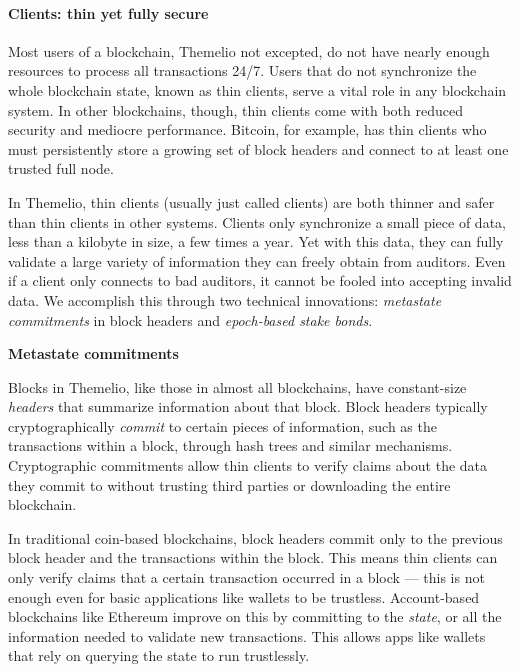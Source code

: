 \documentclass[]{article}
\let\oldparagraph\paragraph
\renewcommand{\paragraph}[1]{\oldparagraph{#1}\mbox{}}
\begin{document}
\hypertarget{clients-thin-yet-fully-secure}{%
\paragraph{Clients: thin yet fully
secure}\label{clients-thin-yet-fully-secure}}

Most users of a blockchain, Themelio not excepted, do not have nearly
enough resources to process all transactions 24/7. Users that do not
synchronize the whole blockchain state, known as thin clients, serve a
vital role in any blockchain system. In other blockchains, though, thin
clients come with both reduced security and mediocre performance.
Bitcoin, for example, has thin clients who must persistently store a
growing set of block headers and connect to at least one trusted full
node.

In Themelio, thin clients (usually just called clients) are both thinner
and safer than thin clients in other systems. Clients only synchronize a
small piece of data, less than a kilobyte in size, a few times a year.
Yet with this data, they can fully validate a large variety of
information they can freely obtain from auditors. Even if a client only
connects to bad auditors, it cannot be fooled into accepting invalid
data. We accomplish this through two technical innovations:
\emph{metastate commitments} in block headers and \emph{epoch-based
stake bonds}.

\textbf{Metastate commitments}

Blocks in Themelio, like those in almost all blockchains, have
constant-size \emph{headers} that summarize information about that
block. Block headers typically cryptographically \emph{commit} to
certain pieces of information, such as the transactions within a block,
through hash trees and similar mechanisms. Cryptographic commitments
allow thin clients to verify claims about the data they commit to
without trusting third parties or downloading the entire blockchain.

In traditional coin-based blockchains, block headers commit only to the
previous block header and the transactions within the block. This means
thin clients can only verify claims that a certain transaction occurred
in a block --- this is not enough even for basic applications like
wallets to be trustless. Account-based blockchains like Ethereum improve
on this by committing to the \emph{state}, or all the information needed
to validate new transactions. This allows apps like wallets that rely on
querying the state to run trustlessly.
\end{document}
